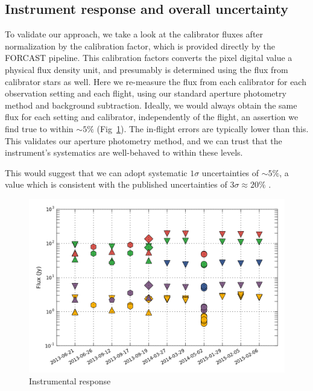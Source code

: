 \subsection{Instrument response and overall uncertainty}
To validate our approach, we take a look at the calibrator fluxes after normalization by the calibration factor, which is provided directly by the FORCAST pipeline. This calibration factors converts the pixel digital value a physical flux density unit, and presumably is determined using the flux from calibrator stars as well. Here we re-measure the flux from each calibrator for each observation setting and each flight, using our standard aperture photometry method and background subtraction. Ideally, we would always obtain the same flux for each setting and calibrator, independently of the flight, an assertion we find true to within $\sim 5\%$ (Fig~\ref{fig:response}). The in-flight errors are typically lower than this. This validates our aperture photometry method, and we can trust that the instrument's systematics are well-behaved to within these levels. 

This would suggest that we can adopt systematic $1\sigma$ uncertainties of $\sim 5\%$, a value which is consistent with the published uncertainties of $3\sigma \approx 20\%$ \citep{DeBuizer:2012ie}.


\begin{figure}[!h]
\begin{center}
\includegraphics[width=\textwidth]{Figures/Phot_val.png}
\vspace{-0.5cm}
\caption[Instrumental response]{Instrumental response}
\label{fig:response}
\end{center}
\end{figure}




